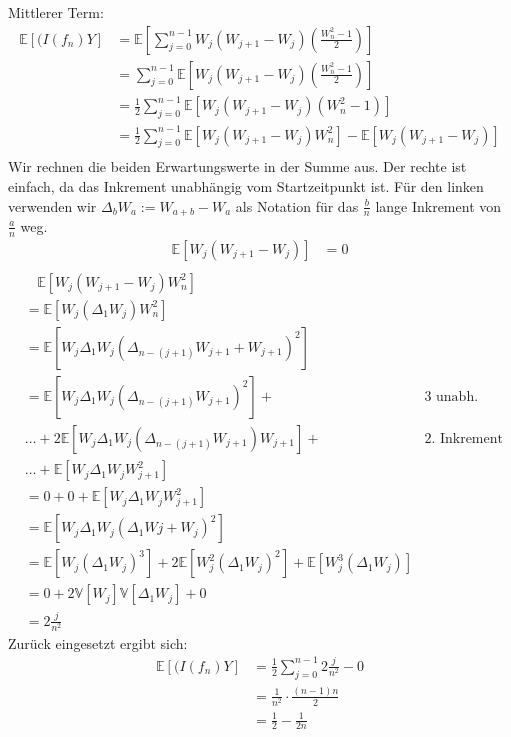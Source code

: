 \documentclass[a4paper,11pt,notitlepage,fullpage]{article}
\newcommand{\Ee}[1]{\mathbb E\left[#1\right]}
\newcommand{\Vv}[1]{\mathbb V\left[#1\right]}
\begin{document}
\begin{enumerate}
\begin{enumerate}
Mittlerer Term:
\begin{align*}
\Ee{(I(f_n)Y} &= \Ee{\sum_{j=0}^{n-1} W_j \left( W_{j+1} - W_j\right) \left(\frac{W_n^2-1}{2}\right)}\\
&= \sum_{j=0}^{n-1} \Ee{W_j \left( W_{j+1} - W_j\right) \left(\frac{W_n^2-1}{2}\right)}\\
&= \frac{1}{2}\sum_{j=0}^{n-1} \Ee{W_j \left( W_{j+1} - W_j\right) \left(W_n^2-1\right)}\\
&= \frac{1}{2}\sum_{j=0}^{n-1} \Ee{W_j \left( W_{j+1} - W_j\right) W_n^2} - \Ee{W_j \left( W_{j+1} - W_j\right)}\\
\end{align*}
Wir rechnen die beiden Erwartungswerte in der Summe aus. Der rechte ist einfach, da das Inkrement unabhängig vom Startzeitpunkt ist. Für den linken verwenden wir $\Delta_b W_a := W_{a+b} - W_a$ als Notation für das $\frac{b}{n}$ lange Inkrement von $\frac{a}{n}$ weg.
\begin{align*}
\Ee{W_j \left( W_{j+1} - W_j\right)} &= 0\\
\end{align*}
\begin{align*}
&~~~~ \Ee{W_j \left( W_{j+1} - W_j\right) W_n^2} \\
&= \Ee{W_j (\Delta_1 W_j) W_n^2}\\
&= \Ee{W_j \Delta_1 W_j (\Delta_{n-(j+1)}W_{j+1} + W_{j+1})^2}\\
&= \Ee{W_j \Delta_1 W_j (\Delta_{n-(j+1)}W_{j+1})^2} + &\text{3 unabh. Faktoren}\\
&\hdots + 2 \Ee{W_j \Delta_1 W_j (\Delta_{n-(j+1)}W_{j+1}) W_{j+1}} + &\text{2. Inkrement unabh.}\\
&\hdots + \Ee{W_j \Delta_1 W_j W_{j+1}^2} \\
&= 0 + 0 + \Ee{W_j \Delta_1 W_j W_{j+1}^2} \\
&= \Ee{W_j \Delta_1 W_j (\Delta_1Wj + W_j)^2} \\
&= \Ee{W_j (\Delta_1 W_j)^3} + 2 \Ee{W_j^2 (\Delta_1 W_j)^2} + \Ee{W_j^3 (\Delta_1 W_j)} \\
&= 0 + 2\Vv{W_j}\Vv{\Delta_1 W_j} + 0 \\
&= 2 \frac{j}{n^2}
\end{align*}
Zurück eingesetzt ergibt sich:
\begin{align*}
\Ee{(I(f_n)Y} &= \frac{1}{2}\sum_{j=0}^{n-1} 2 \frac{j}{n^2} - 0 \\
&= \frac{1}{n^2} \cdot \frac{(n-1)n}{2} \\
&= \frac{1}{2} - \frac{1}{2n}
\end{align*}


\end{enumerate}
\end{enumerate}
\end{document}
